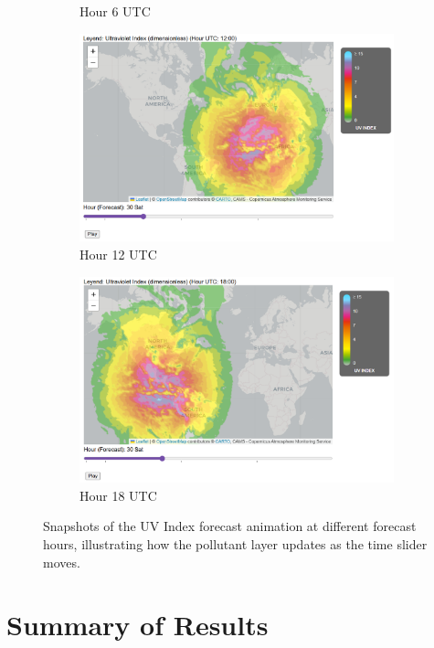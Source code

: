 \begin{figure}[h!]
\begin{subfigure}[b]{0.23\textwidth}
		\caption{Hour 6 UTC}
	\end{subfigure}
	\hfill
	\begin{subfigure}[b]{0.23\textwidth}
		\includegraphics[width=\textwidth]{fig/animation2.png}
		\caption{Hour 12 UTC}
	\end{subfigure}
	\hfill
	\begin{subfigure}[b]{0.23\textwidth}
		\includegraphics[width=\textwidth]{fig/animation3.png}
		\caption{Hour 18 UTC}
	\end{subfigure}
	\caption{Snapshots of the UV Index forecast animation at different forecast hours, illustrating how the pollutant layer updates as the time slider moves.}
	\label{fig:forecast-animation}
\end{figure}


\section{Summary of Results}

